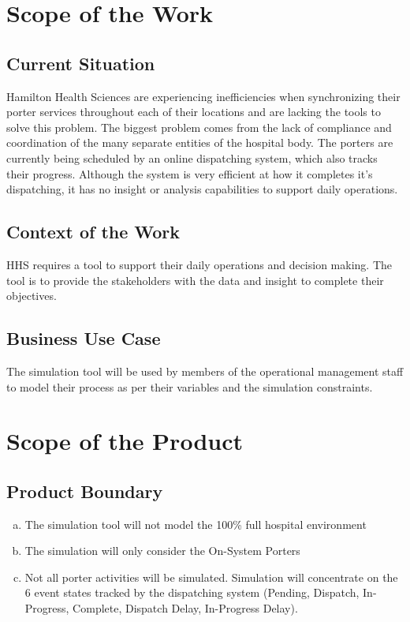 \documentclass[paper=letter, fontsize=10pt]{scrartcl}
\numberwithin{equation}{section}		%
\numberwithin{figure}{section}			%
\numberwithin{table}{section}				%
\begin{document}
\section{Scope of the Work}
\subsection{Current Situation}
Hamilton Health Sciences are experiencing inefficiencies when synchronizing their porter services throughout each of their locations and are lacking the tools to solve this problem. The biggest problem comes from the lack of compliance and coordination of the many separate entities of the hospital body. The porters are currently being scheduled by an online dispatching system, which also tracks their progress. Although the system is very efficient at how it completes it's dispatching, it has no insight or analysis capabilities to support daily operations. 
\subsection{Context of the Work}
HHS requires a tool to support their daily operations and decision making. The tool is to provide the stakeholders with the data and insight to complete their objectives.
\subsection{Business Use Case}
The simulation tool will be used by members of the operational management staff to model their process as per their variables and the simulation constraints.

\section{Scope of the Product}
\subsection{Product Boundary}
\begin{enumerate}[(a)]
	\item The simulation tool will not model the 100\% full hospital environment
	\item The simulation will only consider the On-System Porters
	\item Not all porter activities will be simulated. Simulation will concentrate on the 6 event states tracked by the dispatching system (Pending, Dispatch, In-Progress, Complete, Dispatch Delay, In-Progress Delay).
\end{enumerate} 
\end{document}
